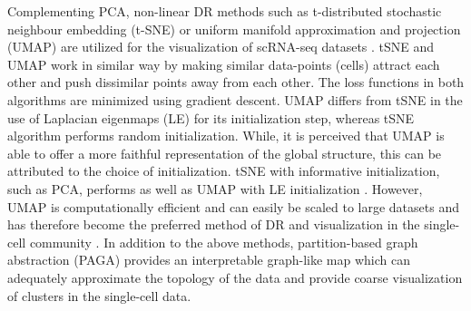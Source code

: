 Complementing PCA, non-linear DR methods such as t-distributed stochastic neighbour embedding (t-SNE) \textbf{\cite{maaten_visualizing_2008}} or uniform manifold approximation and projection (UMAP) \textbf{\cite{mcinnes_umap_2020}} are utilized for the visualization of scRNA-seq datasets \textbf{\cite{lueckenmalte_d_current_2019,heumos_best_2023}}. tSNE and UMAP work in similar way by making similar data-points (cells) attract each other and push dissimilar points away from each other. The loss functions in both algorithms are minimized using gradient descent. UMAP differs from tSNE in the use of Laplacian eigenmaps (LE) for its initialization step, whereas tSNE algorithm performs random initialization. While, it is perceived that UMAP is able to offer a more faithful representation of the global structure, this can be attributed to the choice of initialization. tSNE with informative initialization, such as PCA, performs as well as UMAP with LE initialization \textbf{\cite{kobak_initialization_2021}}. However, UMAP is computationally efficient and can easily be scaled to large datasets and has therefore become the preferred method of DR and visualization in the single-cell community \textbf{\cite{kobak_initialization_2021,becht_dimensionality_2018}}. In addition to the above methods, partition-based graph abstraction (PAGA) \textbf{\cite{wolf_paga_2019}} provides an interpretable graph-like map which can adequately approximate the topology of the data and provide coarse visualization of clusters in the single-cell data.

